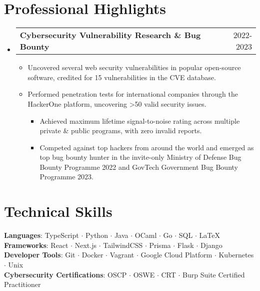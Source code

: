 \documentclass[letterpaper,10pt]{article}
\makeatletter
\newcommand{\resumeItem}[1]{
  \item\small{
    {#1 \vspace{-2pt}}
  }
}
\newcommand{\resumeProjectHeading}[2]{
  \item
  \begin{tabular*}{0.97\textwidth}{l@{\extracolsep{\fill}}r}
    \small#1 & #2 \\
  \end{tabular*}\vspace{-7pt}
}
\newcommand{\resumeSubHeadingListStart}{\begin{itemize}[leftmargin=0.15in, label={}]}
\newcommand{\resumeSubHeadingListEnd}{\end{itemize}}
\newcommand{\resumeItemListStart}{\begin{itemize}}
\newcommand{\resumeItemSubListStart}{\begin{itemize}}
\newcommand{\resumeItemListEnd}{\end{itemize}\vspace{-5pt}}
\newcommand{\resumeItemSubListEnd}{\end{itemize}}
\makeatother
\begin{document}
\section{Professional Highlights}
\resumeSubHeadingListStart
\resumeProjectHeading
{\textbf{Cybersecurity Vulnerability Research \& Bug Bounty}}{2022-2023}
\resumeItemListStart
\resumeItem{Uncovered several web security vulnerabilities in popular open-source software, credited for 15 vulnerabilities in the CVE database.}
\resumeItem{Performed penetration tests for international companies through the HackerOne platform, uncovering >50 valid security issues.}
\resumeItemSubListStart
\resumeItem{Achieved maximum lifetime signal-to-noise rating across multiple private \& public programs, with zero invalid reports.}
\resumeItem{Competed against top hackers from around the world and emerged as top bug bounty hunter in the invite-only Ministry of Defense Bug Bounty Programme 2022 and GovTech Government Bug Bounty Programme 2023.}
\resumeItemSubListEnd
\resumeItemListEnd
\resumeSubHeadingListEnd

%
\section{Technical Skills}
\begin{itemize}[leftmargin=0.15in, label={}]
	\small{\item{
	      \textbf{Languages}{: TypeScript $\cdot$ Python $\cdot$ Java $\cdot$ OCaml $\cdot$ Go $\cdot$ SQL $\cdot$ \LaTeX} \\
	      \textbf{Frameworks}{: React $\cdot$  Next.js $\cdot$ TailwindCSS $\cdot$  Prisma $\cdot$ Flask $\cdot$ Django} \\
	      \textbf{Developer Tools}{: Git $\cdot$ Docker $\cdot$  Vagrant $\cdot$ Google Cloud Platform $\cdot$ Kubernetes $\cdot$ Unix} \\
	      \textbf{Cybersecurity Certifications}{: OSCP $\cdot$ OSWE $\cdot$ CRT $\cdot$ Burp Suite Certified Practitioner}
	      }}
\end{itemize}

\end{document}

